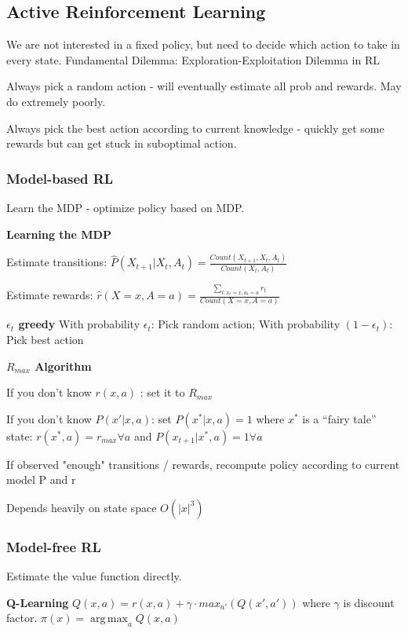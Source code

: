 \documentclass[a4paper, 11pt, landscape]{article}
\DeclareMathOperator*{\argmax}{arg\,max}
\begin{document}
\begin{multicols*}{3}
\subsection{Active Reinforcement Learning}
We are not interested in a fixed policy, but need to decide which action to take in every state. Fundamental Dilemma: Exploration-Exploitation Dilemma in RL

\begin{compactitem}
	\item Always pick a random action - will eventually estimate all prob and rewards. May do extremely poorly. 
	\item Always pick the best action according to current knowledge - quickly get some rewards but can get stuck in suboptimal action.
\end{compactitem}

\subsubsection{Model-based RL }
Learn the MDP - optimize policy based on MDP.

\textbf{Learning the MDP}

Estimate transitions: $\hat{P}(X_{t+1} | X_t, A_t) = \frac{Count(X_{t+1}, X_t, A_t)}{Count(X_t, A_t)}$

Estimate rewards: $\hat{r}(X=x, A= a) = \frac{\sum_{t: x_t = x, a_t = a} r_t}{Count(X = x, A = a)}$

\textbf{ $\epsilon_t$ greedy}
With probability  $\epsilon_t$: Pick random action; With probability $(1- \epsilon_t)$: Pick best action

\textbf{$R_{max}$ Algorithm}

If you don’t know $r(x, a)$ : set it to $R_{max}$

If you don’t know $P(x' | x, a)$: set $P(x^* | x, a) = 1$ where $x^*$ is a “fairy tale” state: $r(x^*, a) = r_{max}  \forall a$ and $P(x_{t+1} | x^*, a) = 1  \forall a$  

If observed "enough" transitions / rewards, recompute policy   according to current model P and r

Depends heavily on state space $O(|x|^3)$


\subsubsection{Model-free RL}
Estimate the value function directly.

\textbf{Q-Learning}
$Q(x, a) = r(x, a) + \gamma \cdot max_{a'} (Q(x', a'))$ where $\gamma$ is discount factor. $\pi(x) = \argmax_a Q(x, a )$


\end{multicols*}
\end{document}
